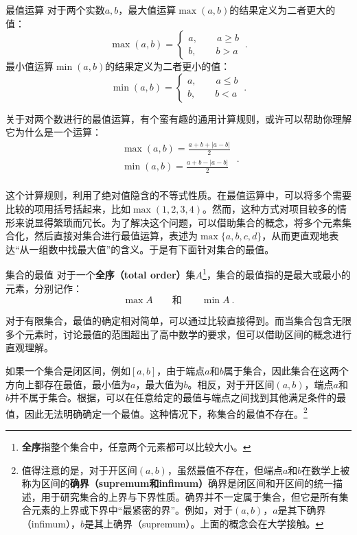 \begin{definition}{最值运算}
对于两个实数$a,b$，最大值运算$\max(a,b)$的结果定义为二者更大的值：
\begin{equation}
\max(a,b)=\begin{cases}
a,\qquad a\geq b\\
b,\qquad b>a
\end{cases}~.
\end{equation}
最小值运算$\min(a,b)$的结果定义为二者更小的值：
\begin{equation}
\min(a,b)=\begin{cases}
a,\qquad a\leq b\\
b,\qquad b<a
\end{cases}~.
\end{equation}
\end{definition}

关于对两个数进行的最值运算，有个蛮有趣的通用计算规则，或许可以帮助你理解它为什么是一个运算：
\begin{equation}
\begin{array}{c} 
\displaystyle\max(a, b) = \frac{a + b + |a - b|}{2} \\  
\displaystyle\min(a, b) = \frac{a + b - |a - b|}{2} \\  
\end{array}~.
\end{equation}

这个计算规则，利用了绝对值隐含的不等式性质。在最值运算中，可以将多个需要比较的项用括号括起来，比如$\max(1,2,3,4)$。然而，这种方式对项目较多的情形来说显得繁琐而冗长。为了解决这个问题，可以借助集合的概念，将多个元素集合化，然后直接对集合进行最值运算，表述为$\max\{a, b, c, d\}$，从而更直观地表达“从一组数中找最大值”的含义。于是有下面针对集合的最值。

\begin{definition}{集合的最值}
对于一个\textbf{全序（total order）}集$A$\footnote{\textbf{全序}指整个集合中，任意两个元素都可以比较大小。}，集合的最值指的是最大或最小的元素，分别记作：
\begin{equation}
\max A\qquad\text{和}\qquad\min A~.
\end{equation}
\end{definition}

对于有限集合，最值的确定相对简单，可以通过比较直接得到。而当集合包含无限多个元素时，讨论最值的范围超出了高中数学的要求，但可以借助区间的概念进行直观理解。

如果一个集合是闭区间，例如$[a, b]$，由于端点$a$和$b$属于集合，因此集合在这两个方向上都存在最值，最小值为$a$，最大值为$b$。相反，对于开区间$(a, b)$，端点$a$和$b$并不属于集合。根据，可以在任意给定的最值与端点之间找到其他满足条件的最值，因此无法明确确定一个最值。这种情况下，称集合的最值不存在。\footnote{值得注意的是，对于开区间$(a, b)$，虽然最值不存在，但端点$a$和$b$在数学上被称为区间的\textbf{确界（supremum和infimum）}确界是闭区间和开区间的统一描述，用于研究集合的上界与下界性质。确界并不一定属于集合，但它是所有集合元素的上界或下界中“最紧密的界”。例如，对于$(a, b)$，$a$是其下确界（infimum），$b$是其上确界（supremum）。上面的概念会在大学接触。}

